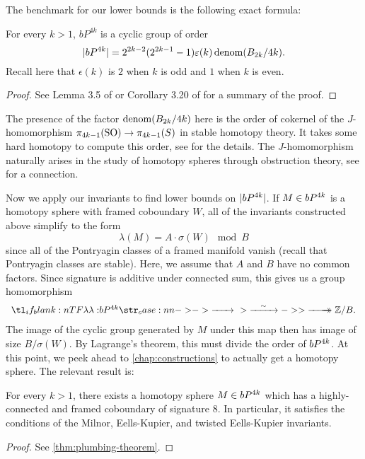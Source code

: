 The benchmark for our lower bounds is the following exact formula:
\begin{theorem}\label{thm:kervaire-milnor}
	For every $k>1$, $bP^{4k}$ is a cyclic group of order
	\[
		|bP^{4k}| =2^{2k-2}(2^{2k-1}-1)\varepsilon(k)\operatorname{denom}(B_{2k}/4k).
	\]
	Recall here that $\epsilon(k)$ is $2$ when $k$ is odd and $1$ when $k$ is even.
\end{theorem}
\begin{proof}
	See Lemma 3.5 of \cite{milnor1958manifolds} or Corollary 3.20 of \cite{levine1985lectures} for a summary of the proof.
\end{proof}

\begin{remark*}
	The presence of the factor $\operatorname{denom}(B_{2k}/4k)$ here is the order of cokernel of the $J$-homomorphism $\pi_{4k-1}(\mathrm{SO}) \to \pi_{4k-1}(S)$ in stable homotopy theory. It takes some hard homotopy to compute this order, see \cite{adams1966J} for the details. The $J$-homomorphism naturally arises in the study of homotopy spheres through obstruction theory, see \cite{milnorkervaire1960bernoulli} for a connection.
\end{remark*}

Now we apply our invariants to find lower bounds on $|bP^{4k}|$. If $M\in bP^{4k}$ is a homotopy sphere with framed coboundary $W$, all of the invariants constructed above simplify to the form
\[
	\lambda(M) = A\cdot \sigma(W) \mod B
\]
since all of the Pontryagin classes of a framed manifold vanish (recall that Pontryagin classes are stable). Here, we assume that $A$ and $B$ have no common factors. Since signature is additive under connected sum, this gives us a group homomorphism
\[
	\lkxfunc{\lambda}{\bP^{4k}}{\Z/B.}
\]
The image of the cyclic group generated by $M$ under this map then has image of size $B/\sigma(W)$. By Lagrange's theorem, this must divide the order of $bP^{4k}$. At this point, we peek ahead to \cref{chap:constructions} to actually get a homotopy sphere. The relevant result is:

\begin{proposition}
	For every $k>1$, there exists a homotopy sphere $M\in bP^{4k}$ which has a highly-connected and framed coboundary of signature 8. In particular, it satisfies the conditions of the Milnor, Eells-Kupier, and twisted Eells-Kupier invariants.
\end{proposition}
\begin{proof}
	See \cref{thm:plumbing-theorem}.
\end{proof}

